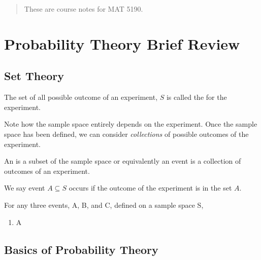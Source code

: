 \begin{abstract}
    These are course notes for MAT 5190.
\end{abstract}

\section{Probability Theory Brief Review}
\subsection{Set Theory}

\begin{definition}
The set of all possible outcome of an experiment, $S$ is called the  for the experiment.
\end{definition}
Note how the sample space entirely depends on the experiment. Once the sample space has been defined, we can consider \textit{collections} of possible outcomes of the experiment.
\begin{definition}[Event]
An  is a subset of the sample space or equivalently
an event is a collection of outcomes of an experiment.
\end{definition}
We say event $A \subseteq S$ occurs if the outcome of the experiment is in the set $A$. 


\begin{theorem}
For any three events, A, B, and C, defined on a sample space S,
    \begin{enumerate}
        \item A
    \end{enumerate}
\end{theorem}

\begin{definition}

\end{definition}

\begin{definition}[Partition]

\end{definition}
\subsection{Basics of Probability Theory}
\begin{definition}

\end{definition}

